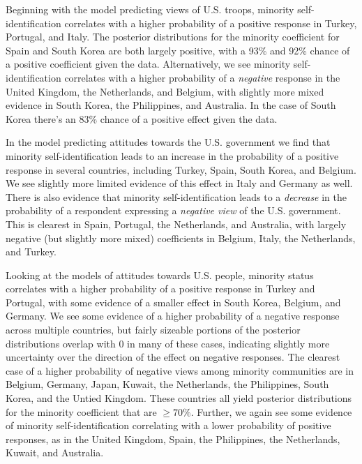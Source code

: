Beginning with the model predicting views of U.S. troops, minority self-identification correlates with a higher probability of a positive response in Turkey, Portugal, and Italy. The posterior distributions for the minority coefficient for Spain and South Korea are both largely positive, with a 93\% and 92\% chance of a positive coefficient given the data. Alternatively, we see minority self-identification correlates with a higher probability of a \textit{negative} response in the United Kingdom, the Netherlands, and Belgium, with slightly more mixed evidence in South Korea, the Philippines, and Australia. In the case of South Korea there's an 83\% chance of a positive effect given the data.

\vspace*{-4cm}

In the model predicting attitudes towards the U.S. government we find that minority self-identification leads to an increase in the probability of a positive response in several countries, including Turkey, Spain, South Korea, and Belgium. We see slightly more limited evidence of this effect in Italy and Germany as well. There is also evidence that minority self-identification leads to a \textit{decrease} in the probability of a respondent expressing a \textit{negative view} of the U.S. government. This is clearest in Spain, Portugal, the Netherlands, and Australia, with largely negative (but slightly more mixed) coefficients in Belgium, Italy, the Netherlands, and Turkey. 

Looking at the models of attitudes towards U.S. people, minority status correlates with a higher probability of a positive response in Turkey and Portugal, with some evidence of a smaller effect in South Korea, Belgium, and Germany. We see some evidence of a higher probability of a negative response across multiple countries, but fairly sizeable portions of the posterior distributions overlap with 0 in many of these cases, indicating slightly more uncertainty over the direction of the effect on negative responses. The clearest case of a higher probability of negative views among minority communities are in Belgium, Germany, Japan, Kuwait, the Netherlands, the Philippines, South Korea, and the Untied Kingdom. These countries all yield posterior distributions for the minority coefficient that are $\geq 70\%$.  Further, we again see some evidence of minority self-identification correlating with a lower probability of positive responses, as in the United Kingdom, Spain, the Philippines, the Netherlands, Kuwait, and Australia.

